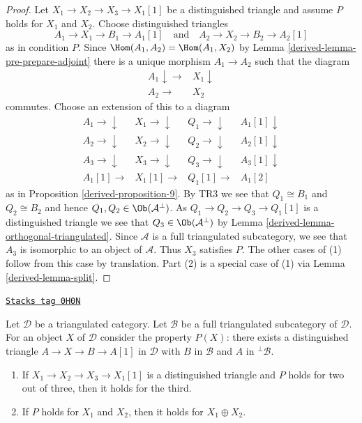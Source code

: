 \begin{proof}

Let $X_1 \to X_2 \to X_3 \to X_1[1]$ be a distinguished triangle
and assume $P$ holds for $X_1$ and $X_2$. Choose distinguished triangles
$$
A_1 \to X_1 \to B_1 \to A_1[1]
\quad\text{and}\quad
A_2 \to X_2 \to B_2 \to A_2[1]
$$
as in condition $P$. Since
$\Hom(A_1, A_2) = \Hom(A_1, X_2)$ by Lemma \ref{derived-lemma-pre-prepare-adjoint}
there is a unique morphism $A_1 \to A_2$ such that the diagram
$$
\begin{array}{cc}A_1 \downarrow\longrightarrow & X_1 \downarrow \\ A_2 \longrightarrow & X_2\end{array}
$$
commutes. Choose an extension of this to a diagram
$$
\begin{array}{cccc}A_1 \longrightarrow\downarrow & X_1 \longrightarrow\downarrow & Q_1 \longrightarrow\downarrow & A_1[1] \downarrow \\ A_2 \longrightarrow\downarrow & X_2 \longrightarrow\downarrow & Q_2 \longrightarrow\downarrow & A_2[1] \downarrow \\ A_3 \longrightarrow\downarrow & X_3 \longrightarrow\downarrow & Q_3 \longrightarrow\downarrow & A_3[1] \downarrow \\ A_1[1] \longrightarrow & X_1[1] \longrightarrow & Q_1[1] \longrightarrow & A_1[2]\end{array}
$$
as in Proposition \ref{derived-proposition-9}. By TR3 we see that
$Q_1 \cong B_1$ and $Q_2 \cong B_2$ and hence
$Q_1, Q_2 \in \Ob(\mathcal{A}^\perp)$.
As $Q_1 \to Q_2 \to Q_3 \to Q_1[1]$
is a distinguished triangle we see that $Q_3 \in \Ob(\mathcal{A}^\perp)$
by Lemma \ref{derived-lemma-orthogonal-triangulated}.
Since $\mathcal{A}$ is a full triangulated subcategory, we see that
$A_3$ is isomorphic to an object of $\mathcal{A}$.
Thus $X_3$ satisfies $P$. The other cases of (1) follow from this
case by translation. Part (2) is a special case of (1)
via Lemma \ref{derived-lemma-split}.
\end{proof}

\begin{lemma}
\label{derived-lemma-prepare-adjoint-dual}
\href{https://stacks.math.columbia.edu/tag/0H0N}{\texttt{Stacks tag 0H0N}}

Let $\mathcal{D}$ be a triangulated category. Let $\mathcal{B}$
be a full triangulated subcategory of $\mathcal{D}$. For an object $X$
of $\mathcal{D}$ consider the property $P(X)$: there exists a
distinguished triangle $A \to X \to B \to A[1]$
in $\mathcal{D}$ with $B$ in $\mathcal{B}$ and $A$ in ${}^\perp\mathcal{B}$.
\begin{enumerate}
\item If $X_1 \to X_2 \to X_3 \to X_1[1]$ is a distinguished triangle
and $P$ holds for two out of three, then it holds for the third.
\item If $P$ holds for $X_1$ and $X_2$, then it holds for $X_1 \oplus X_2$.
\end{enumerate}
\end{lemma}

